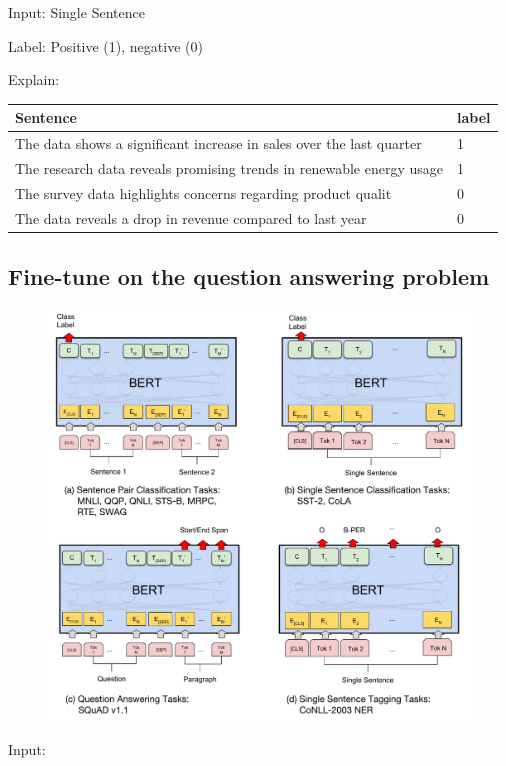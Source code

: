 \documentclass[final,letterpaper,twoside,12pt]{report}
\begin{document}
Input:  Single Sentence

Label: Positive (1), negative (0)

Explain:

\begin{center}
	\begin{tabular}{|p{13cm}|p{1cm}|}
		\hline
		Sentence                                                             & label \\
		\hline
		The data shows a significant increase in sales over the last quarter & 1     \\
		\hline
		The research data reveals promising trends in renewable energy usage & 1     \\
		\hline
		The survey data highlights concerns regarding product qualit         & 0     \\
		\hline
		The data reveals a drop in revenue compared to last year             & 0     \\
		\hline
	\end{tabular}
\end{center}

\newpage

\subsection{Fine-tune on the question answering problem}

\begin{figure}[h]
	\begin{center}
		\includegraphics[trim=0 60 440 415, clip,width=1\textwidth]{BERT_fine_tune.pdf}
	\end{center}
\end{figure}
Input:
\end{document}
